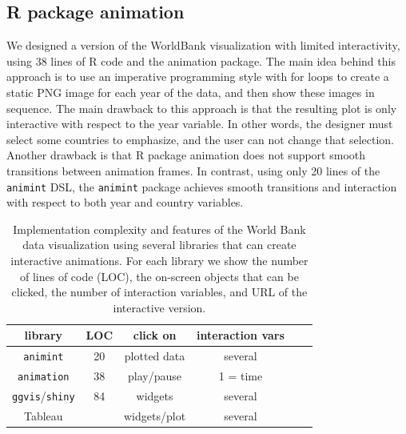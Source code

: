 \documentclass[journal]{vgtc}\usepackage[]{graphicx}\usepackage[]{color}
\begin{document}
\subsection{R package animation}
\label{sec:compare-animation}

We designed a version of the WorldBank visualization with limited
interactivity, using 38 lines of R code and the animation
package. The main idea behind this approach is to use an imperative
programming style with for loops to create a static PNG image for each
year of the data, and then show these images in sequence. The main
drawback to this approach is that the resulting plot is only
interactive with respect to the year variable. In other words, the
designer must select some countries to emphasize, and the user can not
change that selection. Another drawback is that R package
animation does not support smooth transitions between
animation frames. In contrast, using only 20 lines of the \texttt{animint} DSL,
the \texttt{animint} package achieves smooth transitions and interaction with
respect to both year and country variables.

\begin{table}[t!]
  \caption{Implementation complexity and features
    of the World Bank data visualization
    using several libraries that can create interactive animations.
    For each library
    we show the number of lines of code (LOC), the on-screen objects
    that can be clicked,  the
    number of interaction variables, and URL of the interactive version.
  }
 \label{tab:packages}
 \begin{center}
  \begin{tabular}{cccccc}
    library &
    LOC &
    click on &
    interaction vars
    \\
    \hline
    \texttt{animint} &
    20 &
    plotted data &
    several &
    \\
    \texttt{animation} &
    38 &
    play/pause &
    1 = time &
    \\
    \texttt{ggvis}/\texttt{shiny} &
    84 &
    widgets &
    several &
    \\
    Tableau &
      &
    widgets/plot &
    several &
    \\
  \end{tabular}
 \end{center}
\end{table}
\end{document}
